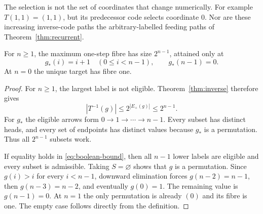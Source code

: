 The selection is not the set of coordinates that change numerically.
For example $T(1,1)=(1,1)$, but its predecessor code selects coordinate
$0$. Nor are these increasing inverse-code paths the arbitrary-labelled
feeding paths of Theorem~\ref{thm:recurrent}.

\begin{theorem}\label{thm:maximum}
For $n\ge1$, the maximum one-step fibre has size $2^{n-1}$, attained
only at
\begin{equation}\label{eq:successor}
 g_*(i)=i+1\quad(0\le i<n-1),\qquad g_*(n-1)=0.
\end{equation}
At $n=0$ the unique target has fibre one.
\end{theorem}

\begin{proof}
For $n\ge1$, the largest label is not eligible. Theorem~\ref{thm:inverse}
therefore gives
\begin{equation}\label{eq:boolean-bound}
 |T^{-1}(g)|\le2^{|E_+(g)|}\le2^{n-1}.
\end{equation}
For $g_*$ the eligible arrows form $0\to1\to\cdots\to n-1$.
Every subset has distinct heads, and every set of endpoints has distinct
values because $g_*$ is a permutation. Thus all $2^{n-1}$ subsets work.

If equality holds in \eqref{eq:boolean-bound}, then all $n-1$ lower
labels are eligible and every subset is admissible. Taking $S=\varnothing$
shows that $g$ is a permutation. Since $g(i)>i$ for every $i<n-1$,
downward elimination forces $g(n-2)=n-1$, then $g(n-3)=n-2$, and
eventually $g(0)=1$. The remaining value is $g(n-1)=0$. At $n=1$ the
only permutation is already $(0)$ and its fibre is one. The empty case
follows directly from the definition.
\end{proof}
